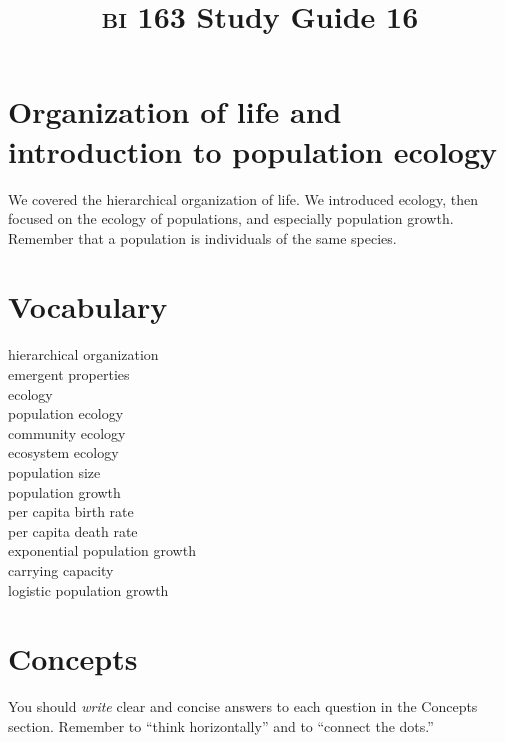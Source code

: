 \documentclass[letterpaper]{tufte-handout}
\title{{\scshape bi} 163 Study Guide 16}
\date{} %
\begin{document}
\maketitle	%

\section*{Organization of life and introduction to population ecology}

We covered the hierarchical organization of life. We introduced ecology, then focused on the ecology of populations, and especially population growth.  Remember that a population is individuals of the same species.

\section*{Vocabulary}

\vspace{-1\baselineskip}
\begin{multicols}{2}
hierarchical organization \\
emergent properties \\
ecology\\
population ecology\\
community ecology \\
ecosystem ecology \\
population size\\
population growth\\
per capita birth rate\\
per capita death rate\\
exponential population growth\\
carrying capacity\\
logistic population growth\\
\end{multicols}

\section*{Concepts}

You should \emph{write} clear and concise answers to each question in the Concepts section.  Remember to ``think horizontally'' and to ``connect the dots.'' 
\end{document}
